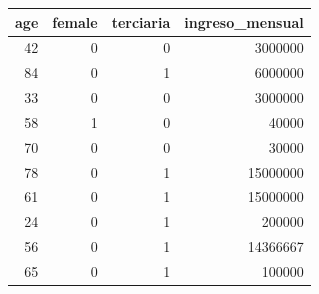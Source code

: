 \begin{tabular}{rrrr}
\toprule
age & female & terciaria & ingreso\_mensual \\
\midrule
42 & 0 & 0 & 3000000 \\
84 & 0 & 1 & 6000000 \\
33 & 0 & 0 & 3000000 \\
58 & 1 & 0 & 40000 \\
70 & 0 & 0 & 30000 \\
78 & 0 & 1 & 15000000 \\
61 & 0 & 1 & 15000000 \\
24 & 0 & 1 & 200000 \\
56 & 0 & 1 & 14366667 \\
65 & 0 & 1 & 100000 \\
\bottomrule
\end{tabular}
